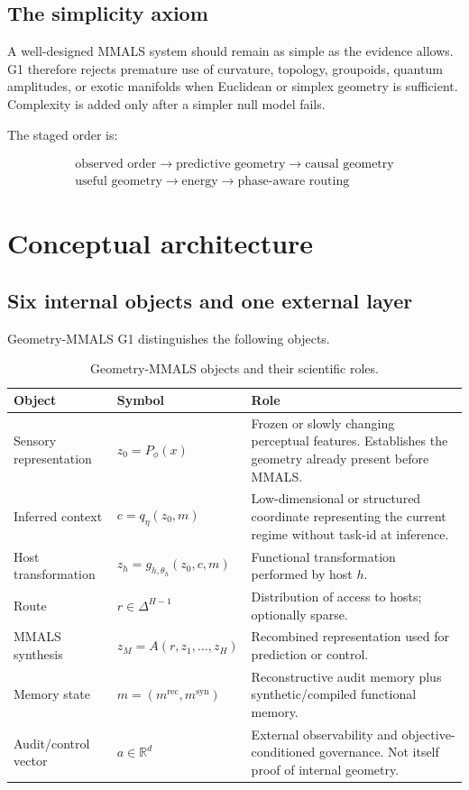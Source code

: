 \documentclass[11pt,a4paper]{article}
\newcommand{\R}{\mathbb{R}}
\begin{document}
\subsection{The simplicity axiom}

A well-designed MMALS system should remain as simple as the evidence allows. G1 therefore rejects premature use of curvature, topology, groupoids, quantum amplitudes, or exotic manifolds when Euclidean or simplex geometry is sufficient. Complexity is added only after a simpler null model fails.

The staged order is:

\begin{equation}
\boxed{\begin{gathered}\text{observed order} \rightarrow \text{predictive geometry} \rightarrow \text{causal geometry}\\\text{useful geometry} \rightarrow \text{energy} \rightarrow \text{phase-aware routing}\end{gathered}}
\end{equation}

\section{Conceptual architecture}

\subsection{Six internal objects and one external layer}

Geometry-MMALS G1 distinguishes the following objects.

\begin{table}[H]
\centering
\caption{Geometry-MMALS objects and their scientific roles.}
\label{tab:objects}
\begin{tabularx}{\textwidth}{@{}p{2.8cm}p{3.4cm}Y@{}}
\toprule
\textbf{Object} & \textbf{Symbol} & \textbf{Role} \\
\midrule
Sensory representation & \(z_0=P_\phi(x)\) & Frozen or slowly changing perceptual features. Establishes the geometry already present before MMALS. \\
Inferred context & \(c=q_\eta(z_0,m)\) & Low-dimensional or structured coordinate representing the current regime without task-id at inference. \\
Host transformation & \(z_h=g_{h,\theta_h}(z_0,c,m)\) & Functional transformation performed by host \(h\). \\
Route & \(r\in\Delta^{H-1}\) & Distribution of access to hosts; optionally sparse. \\
MMALS synthesis & \(z_M=A(r,z_1,\ldots,z_H)\) & Recombined representation used for prediction or control. \\
Memory state & \(m=(m^{\mathrm{rec}},m^{\mathrm{syn}})\) & Reconstructive audit memory plus synthetic/compiled functional memory. \\
Audit/control vector & \(a\in\R^d\) & External observability and objective-conditioned governance. Not itself proof of internal geometry. \\
\bottomrule
\end{tabularx}
\end{table}
\end{document}
